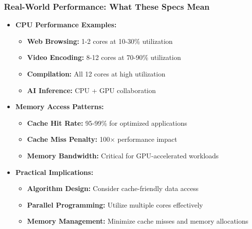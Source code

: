 \begin{frame}
\frametitle{Real-World Performance: What These Specs Mean}
\begin{itemize}
    \item \textbf{CPU Performance Examples:}
    \begin{itemize}
        \item \textbf{Web Browsing:} 1-2 cores at 10-30\% utilization
        \item \textbf{Video Encoding:} 8-12 cores at 70-90\% utilization
        \item \textbf{Compilation:} All 12 cores at high utilization
        \item \textbf{AI Inference:} CPU + GPU collaboration
    \end{itemize}
    \item \textbf{Memory Access Patterns:}
    \begin{itemize}
        \item \textbf{Cache Hit Rate:} 95-99\% for optimized applications
        \item \textbf{Cache Miss Penalty:} 100× performance impact
        \item \textbf{Memory Bandwidth:} Critical for GPU-accelerated workloads
    \end{itemize}
    \item \textbf{Practical Implications:}
    \begin{itemize}
        \item \textbf{Algorithm Design:} Consider cache-friendly data access
        \item \textbf{Parallel Programming:} Utilize multiple cores effectively
        \item \textbf{Memory Management:} Minimize cache misses and memory allocations
    \end{itemize}
\end{itemize}
\end{frame}


